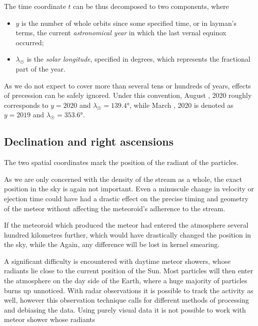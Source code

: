         The time coordinate $t$ can be thus decomposed to two components,
        where
        \begin{itemize}
            \item $y$ is the number of whole orbits since some specified time, or in layman's terms, the current \emph{astronomical year} in which
                the last vernal equinox occurred;
            \item $\lambda_\Sun$ is the \emph{solar longitude}, specified in degrees, which represents the fractional part of the year.
        \end{itemize}

        As we do not expect to cover more than several tens or hundreds of years, effects of precession can be safely ignored.
        Under this convention, August , 2020 roughly corresponds to $y = 2020$ and $\lambda_\Sun = \ang{139.4}$,
        while March , 2020 is denoted as $y = 2019$ and $\lambda_\Sun = \ang{353.6}$.

    \subsection{Declination and right ascensions} \label{ios}
        The two spatial coordinates mark the position of the radiant of the particles.

        As we are only concerned with the density of the stream as a whole,
        the exact position in the sky is again not important.
        Even a minuscule change in velocity or ejection time could have had a drastic effect
        on the precise timing and geometry of the meteor without affecting the meteoroid's
        adherence to the stream.

        If the meteoroid which produced the meteor
        had entered the atmosphere several hundred kilometres further,
        which would have drastically changed the position in the sky, while the
        Again, any difference will be lost in kernel smearing.

        A significant difficulty is encountered with daytime meteor showers, whose radiants
        lie close to the current position of the Sun.
        Most particles will then enter the atmosphere on the day side
        of the Earth, where a huge majority of particles burns up unnoticed.
        With radar observations it is possible to track the activity as well,
        however this observation technique calls for different methods of processing and debiasing the data.
        Using purely visual data it is not possible to work with meteor shower whose radiants

